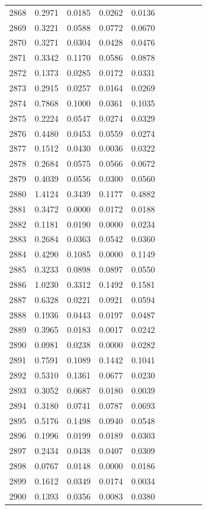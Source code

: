 \begin{table}
\begin{tabular}{cccccccccc}
2868& 0.2971& 0.0185& 0.0262& 0.0136\\ 
2869& 0.3221& 0.0588& 0.0772& 0.0670\\ 
2870& 0.3271& 0.0304& 0.0428& 0.0476\\ 
2871& 0.3342& 0.1170& 0.0586& 0.0878\\ 
2872& 0.1373& 0.0285& 0.0172& 0.0331\\ 
2873& 0.2915& 0.0257& 0.0164& 0.0269\\ 
2874& 0.7868& 0.1000& 0.0361& 0.1035\\ 
2875& 0.2224& 0.0547& 0.0274& 0.0329\\ 
2876& 0.4480& 0.0453& 0.0559& 0.0274\\ 
2877& 0.1512& 0.0430& 0.0036& 0.0322\\ 
2878& 0.2684& 0.0575& 0.0566& 0.0672\\ 
2879& 0.4039& 0.0556& 0.0300& 0.0560\\ 
2880& 1.4124& 0.3439& 0.1177& 0.4882\\ 
2881& 0.3472& 0.0000& 0.0172& 0.0188\\ 
2882& 0.1181& 0.0190& 0.0000& 0.0234\\ 
2883& 0.2684& 0.0363& 0.0542& 0.0360\\ 
2884& 0.4290& 0.1085& 0.0000& 0.1149\\ 
2885& 0.3233& 0.0898& 0.0897& 0.0550\\ 
2886& 1.0230& 0.3312& 0.1492& 0.1581\\ 
2887& 0.6328& 0.0221& 0.0921& 0.0594\\ 
2888& 0.1936& 0.0443& 0.0197& 0.0487\\ 
2889& 0.3965& 0.0183& 0.0017& 0.0242\\ 
2890& 0.0981& 0.0238& 0.0000& 0.0282\\ 
2891& 0.7591& 0.1089& 0.1442& 0.1041\\ 
2892& 0.5310& 0.1361& 0.0677& 0.0230\\ 
2893& 0.3052& 0.0687& 0.0180& 0.0039\\ 
2894& 0.3180& 0.0741& 0.0787& 0.0693\\ 
2895& 0.5176& 0.1498& 0.0940& 0.0548\\ 
2896& 0.1996& 0.0199& 0.0189& 0.0303\\ 
2897& 0.2434& 0.0438& 0.0407& 0.0309\\ 
2898& 0.0767& 0.0148& 0.0000& 0.0186\\ 
2899& 0.1612& 0.0349& 0.0174& 0.0034\\ 
2900& 0.1393& 0.0356& 0.0083& 0.0380\\ 

\end{tabular}
\end{table}
